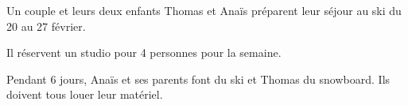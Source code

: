 \documentclass[10pt]{article}
\begin{document}
\setlength\parindent{0mm}
\pagestyle{fancy}
\thispagestyle{empty}
    
    
    




\medskip

Un couple et leurs deux enfants Thomas et Anaïs préparent leur séjour au ski du 20 au 27 février.

Il réservent un studio pour 4 personnes pour la semaine.

Pendant 6 jours, Anaïs et ses parents font du ski et Thomas du snowboard. Ils doivent tous louer leur matériel.
\end{document}
